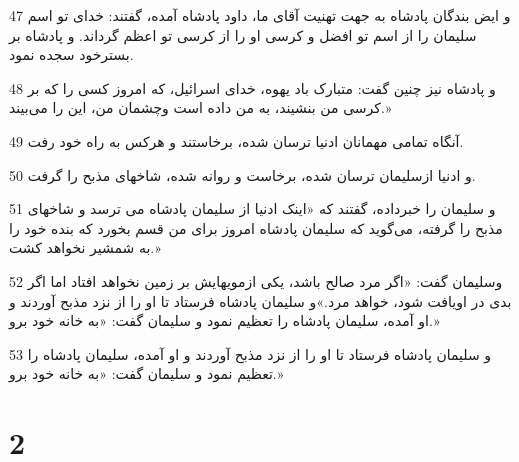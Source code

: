 \par 47 و ایض بندگان پادشاه به جهت تهنیت آقای ما، داود پادشاه آمده، گفتند: خدای تو اسم سلیمان را از اسم تو افضل و کرسی او را از کرسی تو اعظم گرداند. و پادشاه بر بسترخود سجده نمود.
\par 48 و پادشاه نیز چنین گفت: متبارک باد یهوه، خدای اسرائیل، که امروز کسی را که بر کرسی من بنشیند، به من داده است وچشمان من، این را می‌بیند.»
\par 49 آنگاه تمامی مهمانان ادنیا ترسان شده، برخاستند و هرکس به راه خود رفت.
\par 50 و ادنیا ازسلیمان ترسان شده، برخاست و روانه شده، شاخهای مذبح را گرفت.
\par 51 و سلیمان را خبرداده، گفتند که «اینک ادنیا از سلیمان پادشاه می ترسد و شاخهای مذبح را گرفته، می‌گوید که سلیمان پادشاه امروز برای من قسم بخورد که بنده خود را به شمشیر نخواهد کشت.»
\par 52 وسلیمان گفت: «اگر مرد صالح باشد، یکی ازمویهایش بر زمین نخواهد افتاد اما اگر بدی در اویافت شود، خواهد مرد.»و سلیمان پادشاه فرستاد تا او را از نزد مذبح آوردند و او آمده، سلیمان پادشاه را تعظیم نمود و سلیمان گفت: «به خانه خود برو.»
\par 53 و سلیمان پادشاه فرستاد تا او را از نزد مذبح آوردند و او آمده، سلیمان پادشاه را تعظیم نمود و سلیمان گفت: «به خانه خود برو.»
 
\chapter{2}

